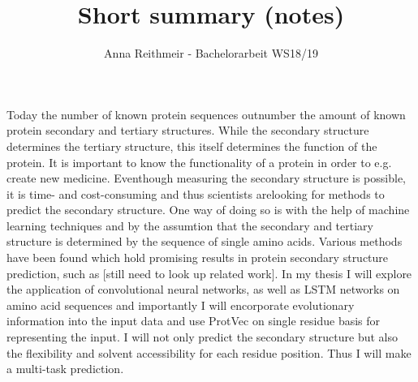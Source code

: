 \documentclass{article}
\title{Short summary (notes)}
\author{Anna Reithmeir - Bachelorarbeit WS18/19}
\begin{document}
\maketitle

Today the number of known protein sequences outnumber the amount of known protein secondary and tertiary structures. While the secondary structure determines the tertiary structure, this itself determines the function of the protein. It is important to know the functionality of a protein in order to e.g. create new medicine. Eventhough measuring the secondary structure is possible, it is time- and cost-consuming and thus scientists arelooking for methods to predict the secondary structure. One way of doing so is with the help of machine learning techniques and by the assumtion that the secondary and tertiary structure is determined by the sequence of single amino acids. Various methods have been found which hold promising results in protein secondary structure prediction, such as [still need to look up related work]. 
In my thesis I will explore the application of convolutional neural networks, as well as LSTM networks on amino acid sequences and importantly I will encorporate evolutionary information into the input data and use ProtVec on single residue basis for representing the input. I will not only predict the secondary structure but also the flexibility and solvent accessibility for each residue position. Thus I will make a multi-task prediction.\\
\end{document}
